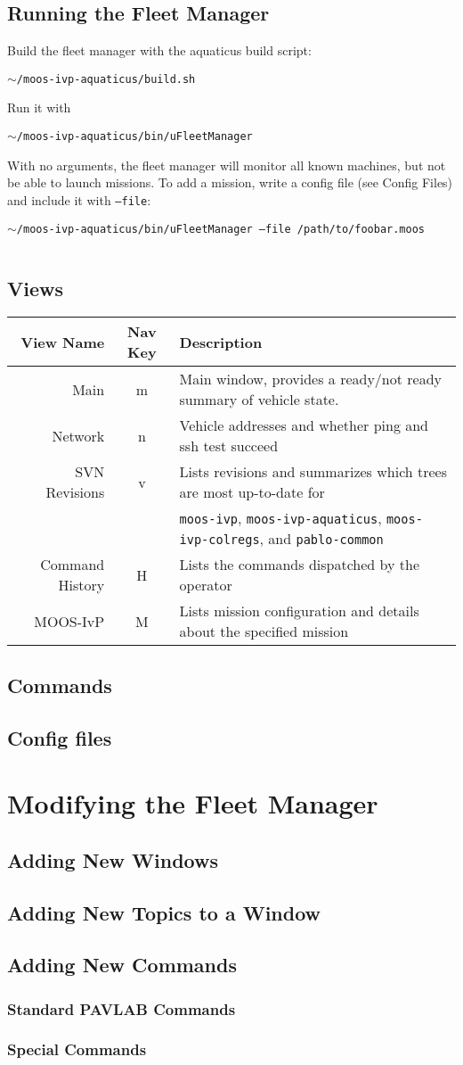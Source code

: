 \documentclass[11pt]{article}
\newcommand{\cmdline}[1]{\vspace{.5em} $\:$\\ \begin{minipage}{\dimexpr\textwidth-2cm}
\texttt{#1}
\end{minipage} $\:$\\ \vspace{-.5em} }
\begin{document}
\subsection{Running the Fleet Manager}
Build the fleet manager with the aquaticus build script:
\cmdline{$\sim$/moos-ivp-aquaticus/build.sh}
Run it with
\cmdline{$\sim$/moos-ivp-aquaticus/bin/uFleetManager}
With no arguments, the fleet manager will monitor all known machines, but not be able to launch missions. To add a mission, write a config file (see Config Files) and include it with \texttt{--file}:
\cmdline{$\sim$/moos-ivp-aquaticus/bin/uFleetManager --file /path/to/foobar.moos}
\subsection{Views}
\begin{tabular}{r|cl}
View Name & Nav Key & Description\\
\hline
Main & m & Main window, provides a ready/not ready summary of vehicle state.\\
Network & n & Vehicle addresses and whether ping and ssh test succeed\\
SVN Revisions & v & Lists revisions and summarizes which trees are most up-to-date for\\&& \texttt{moos-ivp}, \texttt{moos-ivp-aquaticus}, \texttt{moos-ivp-colregs}, and \texttt{pablo-common}\\
Command History & H & Lists the commands dispatched by the operator\\
MOOS-IvP & M & Lists mission configuration and details about the specified mission\\
\end{tabular}
\subsection{Commands}
\subsection{Config files}
\section{Modifying the Fleet Manager}
\subsection{Adding New Windows}
\subsection{Adding New Topics to a Window}
\subsection{Adding New Commands}
\subsubsection{Standard PAVLAB Commands}
\subsubsection{Special Commands}
\end{document}
